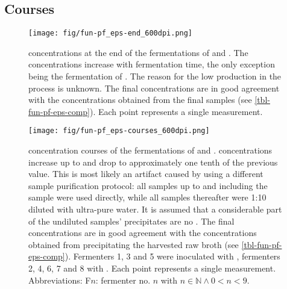 \subsection{\EPS{} Courses\label{sec-fun-pf-eps-courses}}
\begin{figure}
	\begin{center}
		\texttt{[image: fig/fun-pf\_eps-end\_600dpi.png]}
		\caption[Fungal Fermentation Final \EPS{} Concentrations]{\EPS{} concentrations at the end of the fermentations of \rolf{} and \comm{}. The \eps{} concentrations increase with fermentation time, the only exception being the  fermentation of \comm{}. The reason for the low \eps{} production in the  process is unknown. The final concentrations are in good agreement with the concentrations obtained from the final samples (see \vref{tbl-fun-pf-eps-comp}). Each point represents a single measurement.\label{fig-fun-pf-eps-end}}
	\end{center}
\end{figure}
\begin{figure}
	\begin{center}
		\texttt{[image: fig/fun-pf\_eps-courses\_600dpi.png]}
		\caption[Fungal Fermentation \EPS{} Courses]{\EPS{} concentration courses of the fermentations of \rolf{} and \comm{}. \EPS{} concentrations increase up to  and drop to approximately one tenth of the previous value. This is most likely an artifact caused by using a different sample purification protocol: all samples up to and including the  sample were used directly, while all samples thereafter were 1:10 diluted with ultra-pure water. It is assumed that a considerable part of the undiluted samples' precipitates are no \eps{}. The final concentrations are in good agreement with the concentrations obtained from precipitating the harvested raw broth (see \vref{tbl-fun-pf-eps-comp}). Fermenters 1, 3 and 5 were inoculated with \rolf{}, fermenters 2, 4, 6, 7 and 8 with \comm{}. Each point represents a single measurement. Abbreviations: F$n$: fermenter no. $n$ with $n \in \mathbb{N} \land 0 < n < 9$.\label{fig-fun-pf-eps-courses}}
	\end{center}
\end{figure}
